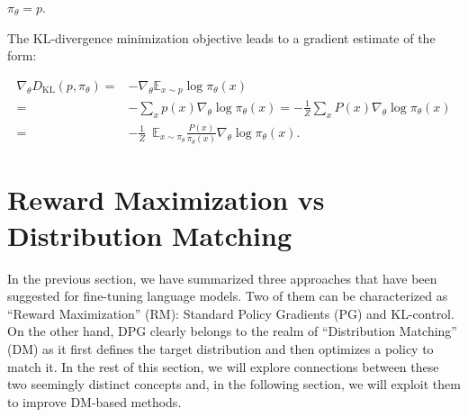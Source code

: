 ${\pi_\theta}=p$. 

The KL-divergence minimization objective leads to a gradient estimate of the form:

\begin{align}

\nabla_\theta D_{\mathrm{KL}}(p, {\pi_\theta}) =& - \nabla_\theta \mathbb{E}_{x\sim p} \log {\pi_\theta}(x) \\
=& - \sum_x p(x) \nabla_\theta \log {\pi_\theta}(x) = - \frac{1}{Z}\sum_x P(x) \nabla_\theta \log {\pi_\theta}(x) \\
=& - \frac{1}{Z} \,\,\, \mathbb{E}_{x \sim {\pi_\theta}} \frac{P(x)}{{\pi_\theta}(x)} \nabla_\theta \log {\pi_\theta}(x).\label{eq:dpgon}

\end{align}

\section{Reward Maximization vs Distribution Matching}

In the previous section, we have summarized three approaches that have been suggested for fine-tuning language models. Two of them can be characterized as ``Reward Maximization'' (RM): Standard Policy Gradients (PG) and KL-control. On the other hand, DPG clearly belongs to the realm of ``Distribution Matching'' (DM) as it first defines the target distribution and then optimizes a policy to match it. In the rest of this section, we will explore connections between these two seemingly distinct concepts and, in the following section, we will exploit them to improve DM-based methods.


